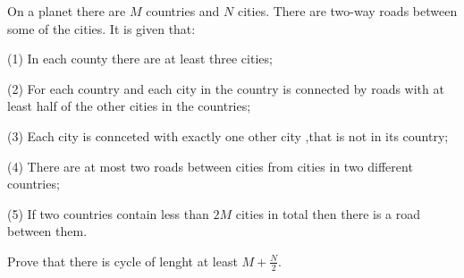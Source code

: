 On a planet there are $M$ countries and $N$ cities. There are two-way roads between some of the cities. It is given that:

(1) In each county there are at least three cities;

(2) For each country and each city in the country is connected by roads with at least half of the other cities in the countries;

(3) Each city is connceted with exactly one other city ,that is not in its country;

(4) There are at most two roads between cities from cities in two different countries;

(5) If two countries contain less than $2M$ cities in total then there is a road between them.

Prove that there is cycle of lenght at least $M+\frac{N}{2}$.